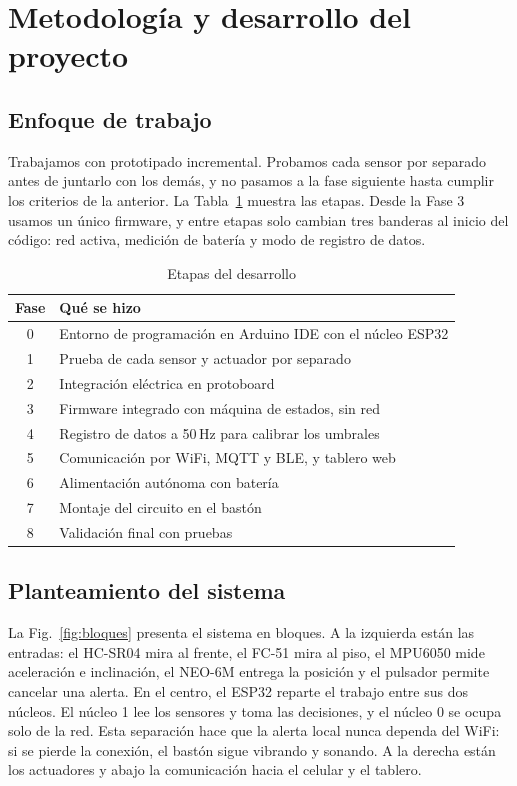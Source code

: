 \documentclass[conference,a4paper]{IEEEtran}
\begin{document}
\section{Metodología y desarrollo del proyecto}

\subsection{Enfoque de trabajo}

Trabajamos con prototipado incremental. Probamos cada sensor por separado antes de juntarlo con los demás, y no pasamos a la fase siguiente hasta cumplir los criterios de la anterior. La Tabla~\ref{tab:fases} muestra las etapas. Desde la Fase 3 usamos un único firmware, y entre etapas solo cambian tres banderas al inicio del código: red activa, medición de batería y modo de registro de datos.

\begin{table}[!t]
\caption{Etapas del desarrollo}
\label{tab:fases}
\centering
\footnotesize
\renewcommand{\arraystretch}{1.15}
\begin{tabular}{c p{6.6cm}}
\toprule
\textbf{Fase} & \textbf{Qué se hizo} \\
\midrule
0 & Entorno de programación en Arduino IDE con el núcleo ESP32 \\
1 & Prueba de cada sensor y actuador por separado \\
2 & Integración eléctrica en protoboard \\
3 & Firmware integrado con máquina de estados, sin red \\
4 & Registro de datos a 50\,Hz para calibrar los umbrales \\
5 & Comunicación por WiFi, MQTT y BLE, y tablero web \\
6 & Alimentación autónoma con batería \\
7 & Montaje del circuito en el bastón \\
8 & Validación final con pruebas \\
\bottomrule
\end{tabular}
\end{table}

\subsection{Planteamiento del sistema}

La Fig.~\ref{fig:bloques} presenta el sistema en bloques. A la izquierda están las entradas: el HC-SR04 mira al frente, el FC-51 mira al piso, el MPU6050 mide aceleración e inclinación, el NEO-6M entrega la posición y el pulsador permite cancelar una alerta. En el centro, el ESP32 reparte el trabajo entre sus dos núcleos. El núcleo 1 lee los sensores y toma las decisiones, y el núcleo 0 se ocupa solo de la red. Esta separación hace que la alerta local nunca dependa del WiFi: si se pierde la conexión, el bastón sigue vibrando y sonando. A la derecha están los actuadores y abajo la comunicación hacia el celular y el tablero.
\end{document}
